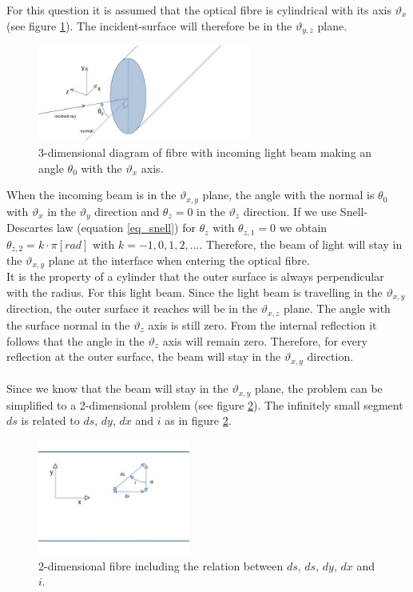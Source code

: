\documentclass{article}
\begin{document}
For this question it is assumed that the optical fibre is cylindrical with its axis $\vartheta _x$ (see figure \ref{fig_fibre_3d}). The incident-surface will therefore be in the $\vartheta _{y,z}$ plane.\\

\begin{figure}[h!]
	\centering
	\includegraphics[width=7cm]{afbeeldingen/fibre_3d.jpg}
	\caption{3-dimensional diagram of fibre with incoming light beam making an angle $\theta _0$ with the $\vartheta _x$ axis.}
	\label{fig_fibre_3d}
\end{figure}

When the incoming beam is in the $\vartheta _{x,y}$ plane, the angle with the normal is $\theta _0$ with $\vartheta _x$ in the $\vartheta _y$ direction and $\theta _z = 0$ in the $\vartheta _z$ direction. If we use Snell-Descartes law (equation \ref{eq_snell}) for $\theta _z$ with $\theta _{z,1} = 0$ we obtain $\theta _{z,2} = k \cdot \pi [rad]$ with $k = -1,0,1,2,...$. Therefore, the beam of light will stay in the $\vartheta _{x,y}$ plane at the interface when entering the optical fibre. \\
It is the property of a cylinder that the outer surface is always perpendicular with the radius. For this light beam. Since the light beam is travelling in the $\vartheta _{x,y}$ direction, the outer surface it reaches will be in the $\vartheta _{x,z}$ plane. The angle with the surface normal in the $\vartheta _z$ axis is still zero. From the internal reflection it follows that the angle in  the $\vartheta _z$ axis will remain zero. Therefore, for every reflection at the outer surface, the beam will stay in the $\vartheta _{x,y}$ direction.\\
\\
Since we know that the beam will stay in the $\vartheta _{x,y}$ plane, the problem can  be simplified to a 2-dimensional problem (see figure \ref{fig_fibre_2d}). The infinitely small segment $ds$ is related to $ds$, $dy$, $dx$ and $i$ as in figure \ref{fig_fibre_2d}.

\begin{figure}[h!]
	\centering
	\includegraphics[width = 5cm]{afbeeldingen/fibre_2d.jpg}
	\caption{2-dimensional fibre including the relation between $ds$, $ds$, $dy$, $dx$ and $i$.}
	\label{fig_fibre_2d}
\end{figure}
\end{document}
